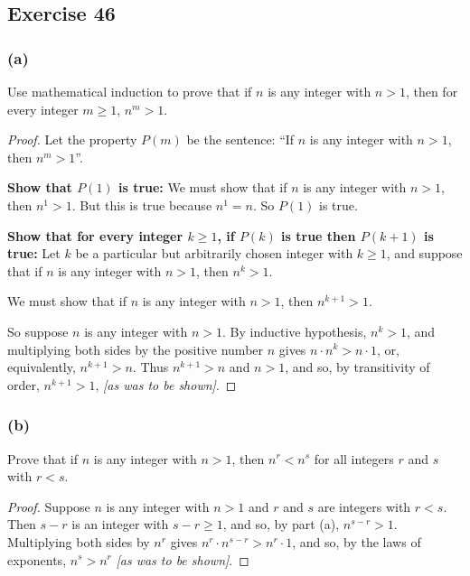 \documentclass[14pt]{extarticle}
\begin{document}
\subsection{Exercise 46}
\subsubsection{(a)}
Use mathematical induction to prove that if \(n\) is any integer with \(n > 1\), then for every integer \(m \geq 1\),
\(n^m > 1\).

\begin{proof}
    Let the property \(P(m)\) be the sentence: ``If \(n\) is any integer with \(n > 1\), then \(n^m > 1\)''.

    {\bf Show that \(P(1)\) is true:} We must show that if \(n\) is any integer with \(n > 1\), then \(n^1 > 1\). But this is
    true because \(n^1 = n\). So \(P(1)\) is true.

        {\bf Show that for every integer \(k \geq 1\), if \(P(k)\) is true then \(P(k + 1)\) is true:} Let \(k\) be a particular but
    arbitrarily chosen integer with \(k \geq 1\), and suppose that if \(n\) is any integer with \(n > 1\), then \(n^k > 1\).

    We must show that if \(n\) is any integer with \(n > 1\), then \(n^{k + 1} > 1\).

    So suppose \(n\) is any integer with \(n > 1\). By inductive hypothesis, \(n^k > 1\), and multiplying both sides by the
    positive number \(n\) gives \(n \cdot n^k > n \cdot 1\), or, equivalently, \(n^{k+1} > n\). Thus \(n^{k+1} > n\) and
    \(n > 1\), and so, by transitivity of order, \(n^{k+1} > 1\),  {\it [as was to be shown]}.
\end{proof}

\subsubsection{(b)}
Prove that if \(n\) is any integer with \(n > 1\), then \(n^r < n^s\) for all integers \(r\) and \(s\) with \(r < s\).

\begin{proof}
    Suppose \(n\) is any integer with \(n > 1\) and \(r\) and \(s\) are integers with \(r < s\). Then \(s - r\) is an integer
    with \(s - r \geq 1\), and so, by part (a), \(n^{s-r} > 1\). Multiplying both sides by \(n^r\) gives \(n^r \cdot n^{s-r} >
    n^r \cdot 1\), and so, by the laws of exponents, \(n^s > n^r\) {\it [as was to be shown]}.
\end{proof}
\end{document}
